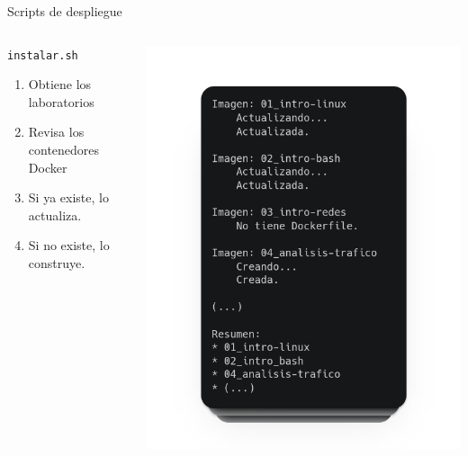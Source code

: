     \begin{frame}{Scripts de despliegue}
        \begin{columns}[c]
                \begin{block}{\texttt{instalar.sh}}
                    \begin{enumerate}
                        \item Obtiene los laboratorios
                        \item Revisa los contenedores Docker
                        \item Si ya existe, lo actualiza.
                        \item Si no existe, lo construye.
                    \end{enumerate}
                \end{block}
            
                \includegraphics[scale=0.2]{images/capturas/instalar.png}
        \end{columns}
    \end{frame}

